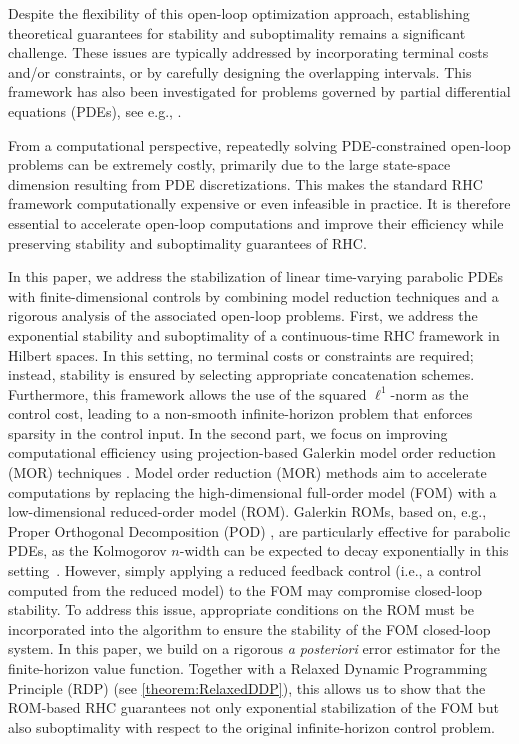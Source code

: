 \documentclass{m2an}
\begin{document}
Despite the flexibility of this open-loop optimization approach, establishing theoretical guarantees for stability and suboptimality remains a significant challenge. These issues are typically addressed by incorporating terminal costs and/or constraints, or by carefully designing the overlapping intervals. This framework has also been investigated for problems governed by partial differential equations (PDEs), see e.g., \cite{azmi2019hybrid,IK02}.

From a computational perspective, repeatedly solving PDE-constrained open-loop problems can be extremely costly, primarily due to the large state-space dimension resulting from PDE discretizations. This makes the standard RHC framework computationally expensive or even infeasible in practice. It is therefore essential to accelerate open-loop computations and improve their efficiency while preserving stability and suboptimality guarantees of RHC.

In this paper, we address the stabilization of linear time-varying parabolic PDEs with finite-dimensional controls by combining model reduction techniques and a rigorous analysis of the associated open-loop problems. First, we address the exponential stability and suboptimality of a continuous-time RHC framework in Hilbert spaces. In this setting, no terminal costs or constraints are required; instead, stability is ensured by selecting appropriate concatenation schemes. Furthermore, this framework allows the use of the squared \(\ell^1\)-norm as the control cost, leading to a non-smooth infinite-horizon problem that enforces sparsity in the control input. In the second part, we focus on improving computational efficiency using projection-based Galerkin model order reduction (MOR) techniques \cite{hesthaven2016certified,HKMU23}. Model order reduction (MOR) methods aim to accelerate computations by replacing the high-dimensional full-order model (FOM) with a low-dimensional reduced-order model (ROM). Galerkin ROMs, based on, e.g., Proper Orthogonal Decomposition (POD) \cite{KV02,GubV17,MU22}, are particularly effective for parabolic PDEs, as the Kolmogorov $n$-width can be expected to decay exponentially in this setting~\cite{cohen2011analytic,HKMU23}. However, simply applying a reduced feedback control (i.e., a control computed from the reduced model) to the FOM may compromise closed-loop stability. To address this issue, appropriate conditions on the ROM must be incorporated into the algorithm to ensure the stability of the FOM closed-loop system. In this paper, we build on a rigorous \emph{a posteriori} error estimator for the finite-horizon value function. Together with a Relaxed Dynamic Programming Principle (RDP) (see \cref{theorem:RelaxedDDP}), this allows us to show that the ROM-based RHC guarantees not only exponential stabilization of the FOM but also suboptimality with respect to the original infinite-horizon control problem.
%
\end{document}
